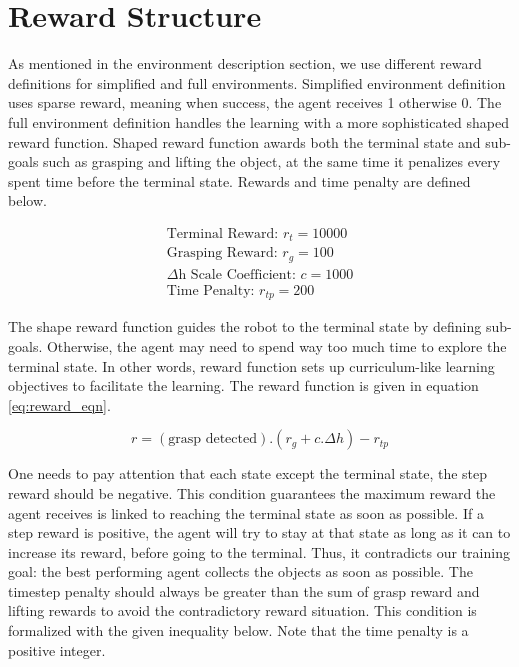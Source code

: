 \section{Reward Structure}

As mentioned in the environment description section, we use different reward definitions for simplified and full environments. Simplified environment definition uses sparse reward, meaning when success, the agent receives 1 otherwise 0. The full environment definition handles the learning with a more sophisticated shaped reward function. 
Shaped reward function awards both the terminal state and sub-goals such as grasping and lifting the object, at the same time it penalizes every spent time before the terminal state. Rewards and time penalty are defined below.

\begin{align*}
    \text{Terminal Reward: } r_t = 10000 \\
    \text{Grasping Reward: } r_g = 100 \\
    \text{\(\Delta\)h Scale Coefficient: } c = 1000 \\
    \text{Time Penalty: } r_{tp} = 200
\end{align*}


The shape reward function guides the robot to the terminal state by defining sub-goals. Otherwise, the agent may need to spend way too much time to explore the terminal state. In other words, reward function sets up curriculum-like learning objectives to facilitate the learning. The reward function is given in equation \ref{eq:reward_eqn}. 

\begin{equation}
    r = (\text{grasp detected}).(r_g + c. \Delta h) - r_{tp}
    \label{eq:reward_eqn}    
\end{equation}


One needs to pay attention that each state except the terminal state, the step reward should be negative. This condition guarantees the maximum reward the agent receives is linked to reaching the terminal state as soon as possible. If a step reward is positive, the agent will try to stay at that state as long as it can to increase its reward, before going to the terminal. Thus, it contradicts our training goal: the best performing agent collects the objects as soon as possible. The timestep penalty should always be greater than the sum of grasp reward and lifting rewards to avoid the contradictory reward situation. This condition is formalized with the given inequality below. Note that the time penalty is a positive integer.

